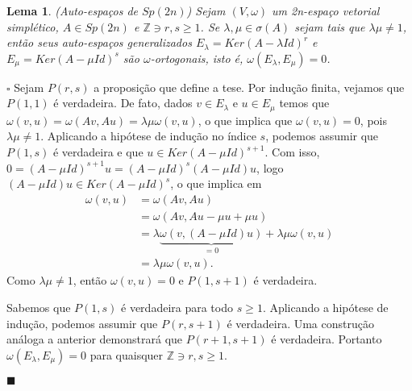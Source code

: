 \documentclass[12pt]{book}
\newtheorem{lema}[teorema]{Lema}
\newenvironment{prova}[1]{$\square$ #1}{\hfill$\blacksquare$}
\newcommand{\formaSimpletica}[2]{\omega(#1, #2)}
\newcommand{\gruposimpletico}[1]{Sp(#1)}
\newcommand{\inteiros}{\mathbb{Z}}
\begin{document}
	\begin{lema}\label{lema_auto_espaco_grupo_simpletico}
		(Auto-espaços de $\gruposimpletico{2n}$) Sejam $(V, \omega)$ um 2n-espaço vetorial simplético, $A \in \gruposimpletico{2n}$ e $\inteiros \ni r,s \geq 1$. Se $\lambda, \mu \in \sigma(A)$ sejam tais que $\lambda\mu \neq 1$, então seus auto-espaços generalizados $E_{\lambda}=Ker(A-\lambda Id)^{r}$ e  $E_{\mu}=Ker(A-\mu Id)^{s}$ são $\omega$-ortogonais, isto é, $\omega(E_{\lambda}, E_{\mu}) = 0$.
	\end{lema}
	\begin{prova}
		Sejam $P(r,s)$ a proposição que define a tese. Por indução finita, vejamos que $P(1,1)$ é verdadeira. De fato, dados $v\in E_{\lambda}$ e $u\in E_{\mu}$ temos que $\formaSimpletica{v}{u} = \formaSimpletica{Av}{Au} = \lambda\mu\formaSimpletica{v}{u}$, o que implica que $\formaSimpletica{v}{u} = 0$, pois $\lambda\mu\neq 1$. Aplicando a hipótese de indução no índice $s$, podemos assumir que $P(1,s)$ é verdadeira e que $u \in Ker(A-\mu Id)^{s+1}$. Com isso, $0=(A-\mu Id)^{s+1}u = (A-\mu Id)^{s}(A-\mu Id)u $, logo $(A-\mu Id)u \in Ker(A-\mu Id)^{s}$, o que implica em
		$$
		\begin{aligned}
		\formaSimpletica{v}{u}
		&=\formaSimpletica{Av}{Au}
		\\
		&= \formaSimpletica{Av}{Au -\mu u +\mu u} 
		\\
		&= \lambda\underbrace{\formaSimpletica{v}{(A-\mu Id)u}}_{=0}+\lambda\mu\formaSimpletica{v}{u}
		\\
		&=\lambda\mu\formaSimpletica{v}{u}.
		\end{aligned}
		$$
		Como $\lambda\mu \neq 1$, então $\formaSimpletica{v}{u}=0$ e $P(1, s+1)$ é verdadeira.
		
		Sabemos que $P(1, s)$ é verdadeira para todo $s\geq 1$. Aplicando a hipótese de indução, podemos assumir que $P(r, s+1)$ é verdadeira. Uma construção análoga a anterior demonstrará que $P(r+1, s+1)$ é verdadeira. Portanto $\omega(E_{\lambda}, E_{\mu}) = 0$ para quaisquer $\inteiros \ni r,s\geq 1$.
		
	\end{prova}
	
\end{document}
